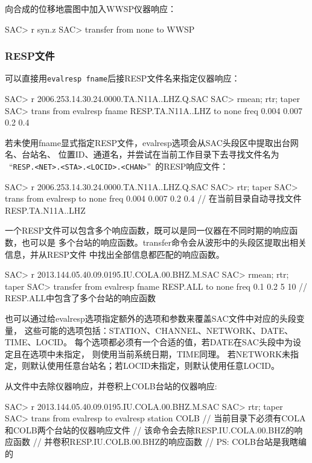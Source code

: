 向合成的位移地震图中加入WWSP仪器响应：
\begin{SACCode}
SAC> r syn.z
SAC> transfer from none to WWSP
\end{SACCode}

\subsubsection{RESP文件}
可以直接用\verb+evalresp fname+后接RESP文件名来指定仪器响应：
\begin{SACCode}
SAC> r 2006.253.14.30.24.0000.TA.N11A..LHZ.Q.SAC
SAC> rmean; rtr; taper
SAC> trans from evalresp fname RESP.TA.N11A..LHZ to none freq 0.004 0.007 0.2 0.4
\end{SACCode}

若未使用fname显式指定RESP文件，evalresp选项会从SAC头段区中提取出台网名、台站名、
位置ID、通道名，并尝试在当前工作目录下去寻找文件名为
~``\verb+RESP.<NET>.<STA>.<LOCID>.<CHAN>+''~的RESP响应文件：
\begin{SACCode}
SAC> r 2006.253.14.30.24.0000.TA.N11A..LHZ.Q.SAC
SAC> rtr; taper
SAC> trans from evalresp to none freq 0.004 0.007 0.2 0.4
            // 在当前目录自动寻找文件RESP.TA.N11A..LHZ
\end{SACCode}

一个RESP文件可以包含多个响应函数，既可以是同一仪器在不同时期的响应函数，也可以是
多个台站的响应函数。transfer命令会从波形中的头段区提取出相关信息，并从RESP文件
中找出全部信息都匹配的响应函数。
\begin{SACCode}
SAC> r 2013.144.05.40.09.0195.IU.COLA.00.BHZ.M.SAC
SAC> rmean; rtr; taper
SAC> transfer from evalresp fname RESP.ALL to none freq 0.1 0.2 5 10
        // RESP.ALL中包含了多个台站的响应函数
\end{SACCode}

也可以通过给evalresp选项指定额外的选项和参数来覆盖SAC文件中对应的头段变量，
这些可能的选项包括：STATION、CHANNEL、NETWORK、DATE、TIME、LOCID。
每个选项都必须有一个合适的值，若DATE在SAC头段中为设定且在选项中未指定，
则使用当前系统日期，TIME同理。
若NETWORK未指定，则默认使用任意台站名；若LOCID未指定，则默认使用任意LOCID。

从文件中去除仪器响应，并卷积上COLB台站的仪器响应:
\begin{SACCode}
SAC> r 2013.144.05.40.09.0195.IU.COLA.00.BHZ.M.SAC
SAC> rtr; taper
SAC> trans from evalresp to evalresp station COLB
    // 当前目录下必须有COLA和COLB两个台站的仪器响应文件
    // 该命令会去除RESP.IU.COLA.00.BHZ的响应函数
    // 并卷积RESP.IU.COLB.00.BHZ的响应函数
    // PS: COLB台站是我瞎编的
\end{SACCode}

